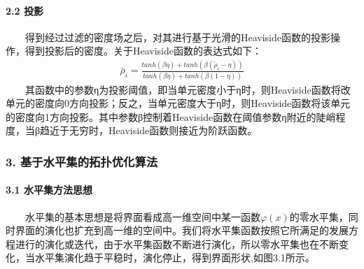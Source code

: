 \documentclass[a4paper,10pt,english]{sphinxmanual}
\begin{document}






\paragraph{2.2 投影}
\label{\detokenize{_u7b80_u4ecb/_u6838_u5fc3_u8bbe_u8ba1_u4f18_u5316_u7b97_u6cd5/_u68af_u5ea6_u62d3_u6251_u4f18_u5316_u6a21_u5757/_u68af_u5ea6_u62d3_u6251_u4f18_u5316_u7b97_u6cd5:id7}}
\sphinxAtStartPar
  得到经过过滤的密度场之后，对其进行基于光滑的Heaviside函数的投影操作，得到投影后的密度。关于Heaviside函数的表达式如下：
\begin{equation*}
\begin{split}\bar{ρ}_i=\frac{tanh(βη)+tanh(β(\tilde{ρ}_i-η))}{tanh(βη)+tanh(β(1-η))}\end{split}
\end{equation*}
\sphinxAtStartPar
  其函数中的参数η为投影阈值，即当单元密度小于η时，则Heaviside函数将改单元的密度向0方向投影；反之，当单元密度大于η时，则Heaviside函数将该单元的密度向1方向投影。其中参数β控制着Heaviside函数在阈值参数η附近的陡峭程度，当β趋近于无穷时，Heaviside函数则接近为阶跃函数。


\subsubsection{3. 基于水平集的拓扑优化算法}
\label{\detokenize{_u7b80_u4ecb/_u6838_u5fc3_u8bbe_u8ba1_u4f18_u5316_u7b97_u6cd5/_u68af_u5ea6_u62d3_u6251_u4f18_u5316_u6a21_u5757/_u68af_u5ea6_u62d3_u6251_u4f18_u5316_u7b97_u6cd5:id8}}

\paragraph{3.1 水平集方法思想}
\label{\detokenize{_u7b80_u4ecb/_u6838_u5fc3_u8bbe_u8ba1_u4f18_u5316_u7b97_u6cd5/_u68af_u5ea6_u62d3_u6251_u4f18_u5316_u6a21_u5757/_u68af_u5ea6_u62d3_u6251_u4f18_u5316_u7b97_u6cd5:id9}}
\sphinxAtStartPar
  水平集的基本思想是将界面看成高一维空间中某一函数\(φ(x)\)的零水平集，同时界面的演化也扩充到高一维的空间中。我们将水平集函数按照它所满足的发展方程进行的演化或迭代，由于水平集函数不断进行演化，所以零水平集也在不断变化，当水平集演化趋于平稳时，演化停止，得到界面形状,如图3.1所示。


\sphinxAtStartPar
{}
\end{document}
